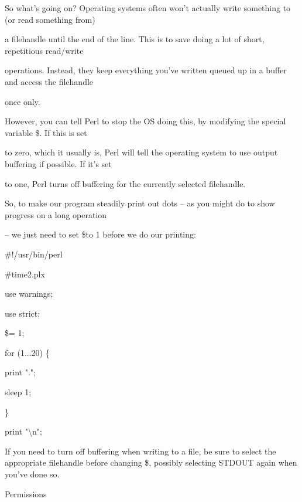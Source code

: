 \documentclass[a4paper,11pt]{book}
\begin{document}
\noindent 

\noindent So what's going on? Operating systems often won't actually write something to (or read something from)

\noindent a filehandle until the end of the line. This is to save doing a lot of short, repetitious read/write

\noindent operations. Instead, they keep everything you've written queued up in a buffer and access the filehandle

\noindent once only.

\noindent 

\noindent However, you can tell Perl to stop the OS doing this, by modifying the special variable \$\textbar . If this is set

\noindent to zero, which it usually is, Perl will tell the operating system to use output buffering if possible. If it's set

\noindent to one, Perl turns off buffering for the currently selected filehandle.

\noindent 

\noindent So, to make our program steadily print out dots -- as you might do to show progress on a long operation

\noindent -- we just need to set \$\textbar  to 1 before we do our printing:

\noindent 

\noindent \#!/usr/bin/perl

\noindent \#time2.plx

\noindent use warnings;

\noindent use strict;

\noindent 

\noindent \$\textbar = 1;

\noindent for (1...20) \{

\noindent print ".";

\noindent sleep 1;

\noindent \}

\noindent print "\textbackslash n";

\noindent 

\noindent If you need to turn off buffering when writing to a file, be sure to select the appropriate filehandle before changing \$\textbar , possibly selecting STDOUT again when you've done so.

\noindent 

\noindent 

\noindent Permissions
\end{document}
